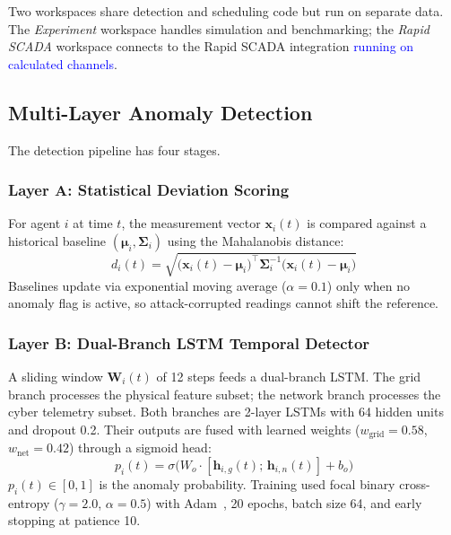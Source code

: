 \documentclass[conference,a4paper]{IEEEtran}
\begin{document}
Two workspaces share detection and scheduling code but run on separate data. The \textit{Experiment} workspace handles simulation and benchmarking; the \textit{Rapid SCADA} workspace connects to the Rapid SCADA integration \textcolor{blue}{running on calculated channels}.

\subsection{Multi-Layer Anomaly Detection}

The detection pipeline has four stages.

\subsubsection{Layer A: Statistical Deviation Scoring}

For agent $i$ at time $t$, the measurement vector $\mathbf{x}_i(t)$ is compared against a historical baseline $(\boldsymbol{\mu}_i, \boldsymbol{\Sigma}_i)$ using the Mahalanobis distance:
\begin{equation}
d_i(t) = \sqrt{\bigl(\mathbf{x}_i(t) - \boldsymbol{\mu}_i\bigr)^\top \boldsymbol{\Sigma}_i^{-1} \bigl(\mathbf{x}_i(t) - \boldsymbol{\mu}_i\bigr)}
\label{eq:mahal}
\end{equation}
Baselines update via exponential moving average ($\alpha=0.1$) only when no anomaly flag is active, so attack-corrupted readings cannot shift the reference.

\subsubsection{Layer B: Dual-Branch LSTM Temporal Detector}

A sliding window $\mathbf{W}_i(t)$ of 12 steps feeds a dual-branch LSTM. The grid branch processes the physical feature subset; the network branch processes the cyber telemetry subset. Both branches are 2-layer LSTMs with 64 hidden units and dropout 0.2. Their outputs are fused with learned weights ($w_{\text{grid}}=0.58$, $w_{\text{net}}=0.42$) through a sigmoid head:
\begin{equation}
p_i(t) = \sigma\!\bigl(W_o \cdot [\mathbf{h}_{i,g}(t);\, \mathbf{h}_{i,n}(t)] + b_o\bigr)
\label{eq:lstm}
\end{equation}
$p_i(t) \in [0,1]$ is the anomaly probability. Training used focal binary cross-entropy ($\gamma=2.0$, $\alpha=0.5$) with Adam~\cite{b16}, 20 epochs, batch size 64, and early stopping at patience 10.
\end{document}
